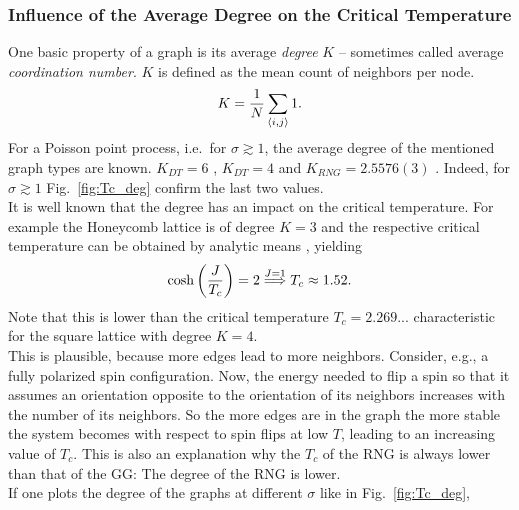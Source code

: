     \subsubsection{Influence of the Average Degree on the Critical Temperature}
        One basic property of a graph is its average \emph{degree} \(K\) -- sometimes
        called average \emph{coordination number}. \(K\) is defined as the mean count
        of neighbors per node.
        \begin{equation}
            K = \frac{1}{N} \sum_{\left< i,j \right>} 1.
            \label{eq:degree}
        \end{equation}
        For a Poisson point process, i.e.\ for \(\sigma \gtrsim 1\),
        the average degree of the mentioned graph types are known.
        \(K_{DT} = 6\) \cite{DelaunayDegree}, \(K_{DT} = 4\) \cite{notPChristoph} and \(K_{RNG} = 2.5576(3)\) \cite{RNGCell}.
        Indeed, for \(\sigma \gtrsim 1\) Fig.\ \ref{fig:Tc_deg}
        confirm the last two values.\\
        It is well known that the degree has an impact on the critical temperature.
        For example the Honeycomb lattice is of degree \(K=3\) and the
        respective critical temperature can be obtained by analytic means \cite{Wannier1945},
        yielding
        \begin{equation}
            \cosh\left(\frac{J}{T_c}\right)=2 \overset{J=1}{\Longrightarrow} T_c \approx 1.52.
            \label{eq:exactHCTc}
        \end{equation}
        Note that this is lower than the critical temperature \(T_c = 2.269...\)
        characteristic for the square lattice with degree \(K=4\).\\
        This is plausible, because more edges lead to more neighbors.
        Consider, e.g., a fully polarized spin configuration. Now, the
        energy needed to flip a spin so that it assumes an orientation opposite
        to the orientation of its neighbors increases with the number of
        its neighbors. So the more edges are in
        the graph the more stable the system becomes with respect to spin flips
        at low \(T\), leading to an increasing value of \(T_c\).
        This is also an explanation why the \(T_c\) of the RNG is always
        lower than that of the GG: The degree of the RNG is lower.\\
        If one plots the degree of the graphs at different \(\sigma\) like
        in Fig.\ \ref{fig:Tc_deg},

